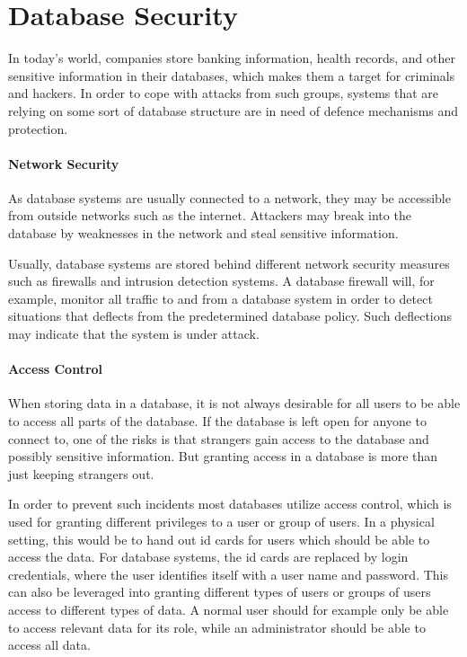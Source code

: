 \section{Database Security}
\label{chp:database_Security}

In today's world, companies store banking information, health records, and other sensitive information in their databases, which makes them a target for criminals and hackers. In order to cope with attacks from such groups, systems that are relying on some sort of database structure are in need of defence mechanisms and protection.

\paragraph{Network Security}

As database systems are usually connected to a network, they may be accessible from outside networks such as the internet. Attackers may break into the database by weaknesses in the network and steal sensitive information.

Usually, database systems are stored behind different network security measures such as firewalls and intrusion detection systems. A database firewall will, for example, monitor all traffic to and from a database system in order to detect situations that deflects from the predetermined database policy. Such deflections may indicate that the system is under attack.


\paragraph{Access Control}

When storing data in a database, it is not always desirable for all users to be able to access all parts of the database. If the database is left open for anyone to connect to, one of the risks is that strangers gain access to the database and possibly sensitive information. But granting access in a database is more than just keeping strangers out.

In order to prevent such incidents most databases utilize access control, which is used for granting different privileges to a user or group of users. In a physical setting, this would be to hand out id cards for users which should be able to access the data. For database systems, the id cards are replaced by login credentials, where the user identifies itself with a user name and password. This can also be leveraged into granting different types of users or groups of users access to different types of data. A normal user should for example only be able to access relevant data for its role, while an administrator should be able to access all data.

